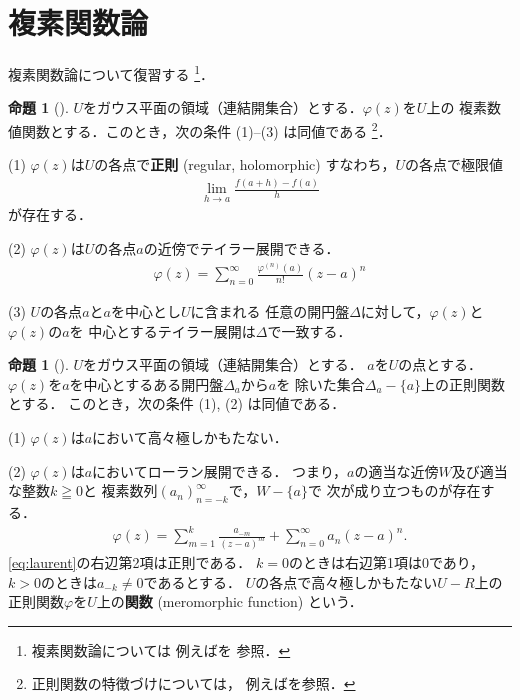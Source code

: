\documentclass[11pt, a4paper, dvipdfmx, draft]{jsarticle}
\theoremstyle{definition}
\newtheorem{Proposition}[Axiom]{命題}
\newcommand{\pphi}{\varphi} %
\theoremstyle{mystyle}
\numberwithin{equation}{section} %
\begin{document}
\section{複素関数論}

複素関数論について復習する
\footnote{
    複素関数論については
    例えば\cite{jimbo,yoshida,kaneko,fuji}を
    参照．
}．


\begin{Proposition}[{\cite[定義--命題1.5]{ogs}}]
    $U$をガウス平面の領域（連結開集合）とする．$\pphi(z)$を$U$上の
    複素数値関数とする．このとき，次の条件 (1)--(3) は同値である
    \footnote{
        正則関数の特徴づけについては，
        例えば\cite[4.3節]{kaneko}を参照．
    }．

    (1) 
    $\pphi(z)$は$U$の各点で\textbf{正則} (regular, holomorphic) すなわち，$U$の各点で極限値\begin{align*}
        \lim_{h\to a}\frac{f(a+h)-f(a)}{h}
    \end{align*}が存在する．

    (2) 
    $\pphi(z)$は$U$の各点$a$の近傍でテイラー展開できる．
    \begin{align*}
        \pphi(z)=\sum_{n=0}^{\infty}\frac{\pphi^{(n)}(a)}{n!}(z-a)^{n}
    \end{align*}

    (3) 
    $U$の各点$a$と$a$を中心とし$U$に含まれる
    任意の開円盤$\Delta$に対して，$\pphi(z)$と$\pphi(z)$の$a$を
    中心とするテイラー展開は$\Delta$で一致する．
\end{Proposition}

\begin{Proposition}[{\cite[定義--命題1.6]{ogs}}]
    $U$をガウス平面の領域（連結開集合）とする．
    $a$を$U$の点とする．
    $\pphi(z)$を$a$を中心とするある開円盤$\Delta_a$から$a$を
    除いた集合$\Delta_a-\{a\}$上の正則関数とする．
    このとき，次の条件 (1), (2) は同値である．

    (1) 
    $\pphi(z)$は$a$において高々極しかもたない．

    (2) 
    $\pphi(z)$は$a$においてローラン展開できる．
    つまり，$a$の適当な近傍$W$及び適当な整数$k\geqq0$と
    複素数列$(a_n)_{n=-k}^{\infty}$で，$W-\{a\}$で
    次が成り立つものが存在する．
    \begin{align}
        \pphi(z)=\sum_{m=1}^{k}\frac{a_{-m}}{(z-a)^{m}}
        +\sum_{n=0}^{\infty}a_n(z-a)^{n}. \label{eq:laurent}
    \end{align}
    \eqref{eq:laurent}の右辺第2項は正則である．
    $k=0$のときは右辺第1項は$0$であり，
    $k>0$のときは$a_{-k}\ne0$であるとする．
    $U$の各点で高々極しかもたない$U-R$上の
    正則関数$\pphi$を$U$上の\textbf{関数} (meromorphic function) という．
\end{Proposition}
\end{document}
